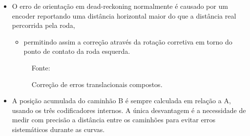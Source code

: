 \documentclass[xcolor=dvipsnames, aspectratio=169]{beamer}
\begin{document}
\begin{frame}
\begin{itemize}
    \item O erro de orientação em dead-reckoning normalmente é causado por um encoder reportando uma distância horizontal maior do que a distância real percorrida pela roda,
    \begin{itemize}
      \item permitindo assim a correção através da rotação corretiva em torno do ponto de contato da roda esquerda.
    \end{itemize} 
    \newpage
    \begin{figure}
      \centering
      {Fonte: \cite{borenstein1995intemal}}
      \caption{Correção de erros translacionais compostos.}
      \label{fig:2_correcting_composite_translational_errors}
    \end{figure} 
    \item A posição acumulada do caminhão B é sempre calculada em relação a A, usando os três codificadores internos. A única desvantagem é a necessidade de medir com precisão a distância entre os caminhões para evitar erros sistemáticos durante as curvas.
  \end{itemize}
  
\end{frame}

\end{document}
